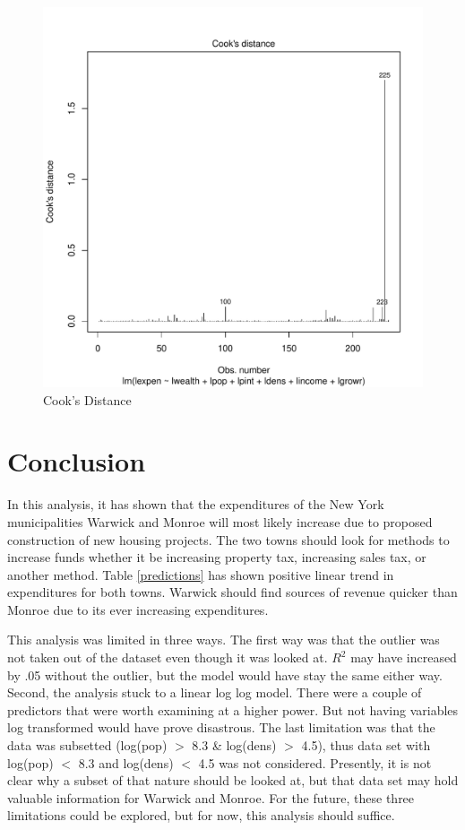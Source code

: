 \documentclass{article}\usepackage[]{graphicx}\usepackage[]{color}
\newenvironment{knitrout}{}{} %
\begin{document}
\begin{figure}
  \begin{center}
    \caption{Cook's Distance}
      \label{cook}
\begin{knitrout}
\color{fgcolor}
\includegraphics[width=0.4\linewidth]{figure/Cooks_Distance-1} 

\end{knitrout}
\end{center}
\end{figure}

\section{Conclusion}
\qquad In this analysis, it has shown that the expenditures of the New York municipalities Warwick and Monroe will most likely increase due to proposed construction of new housing projects. The two towns should look for methods to increase funds whether it be increasing property tax, increasing sales tax, or another method. Table \ref{predictions} has shown positive linear trend in expenditures for both towns. Warwick should find sources of revenue quicker than Monroe due to its ever increasing expenditures.

\qquad This analysis was limited in three ways. The first way was that the outlier was not taken out of the dataset even though it was looked at. $R^2$ may have increased by .05 without the outlier, but the model would have stay the same either way. Second, the analysis stuck to a linear log log model. There were a couple of predictors that were worth examining at a higher power. But not having variables log transformed would have prove disastrous. The last limitation was that the data was subsetted (log(pop) $>$ 8.3 \& log(dens) $>$ 4.5), thus data set with log(pop) $<$ 8.3 and log(dens) $<$ 4.5 was not considered. Presently, it is not clear why a subset of that nature should be looked at, but that data set may hold valuable information for Warwick and Monroe. For the future, these three limitations could be explored, but for now, this analysis should suffice. 
\end{document}

